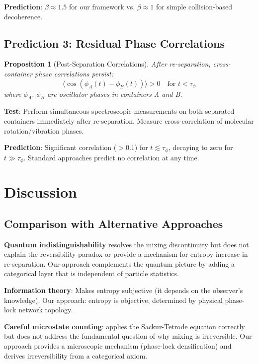 \documentclass[superscriptaddress,prb,10pt]{revtex4-2}
\newtheorem{proposition}[theorem]{Proposition}
\theoremstyle{definition}
\theoremstyle{remark}
\begin{document}
\textbf{Prediction}: $\beta \approx 1.5$ for our framework vs. $\beta \approx 1$ for simple collision-based decoherence.

\subsection{Prediction 3: Residual Phase Correlations}

\begin{proposition}[Post-Separation Correlations]
After re-separation, cross-container phase correlations persist:
\begin{equation}
\langle \cos(\phi_A(t) - \phi_B(t)) \rangle > 0 \quad \text{for } t < \tau_{\phi}
\end{equation}
where $\phi_A$, $\phi_B$ are oscillator phases in containers A and B.
\end{proposition}

\textbf{Test}: Perform simultaneous spectroscopic measurements on both separated containers immediately after re-separation. Measure cross-correlation of molecular rotation/vibration phases.

\textbf{Prediction}: Significant correlation ($> 0.1$) for $t \lesssim \tau_{\phi}$, decaying to zero for $t \gg \tau_{\phi}$. Standard approaches predict no correlation at any time.

\section{Discussion}

\subsection{Comparison with Alternative Approaches}

\textbf{Quantum indistinguishability} resolves the mixing discontinuity but does not explain the reversibility paradox or provide a mechanism for entropy increase in re-separation. Our approach complements the quantum picture by adding a categorical layer that is independent of particle statistics.

\textbf{Information theory}: Makes entropy subjective (it depends on the observer's knowledge). Our approach: entropy is objective, determined by physical phase-lock network topology.

\textbf{Careful microstate counting}: applies the Sackur-Tetrode equation correctly but does not address the fundamental question of why mixing is irreversible. Our approach provides a microscopic mechanism (phase-lock densification) and derives irreversibility from a categorical axiom.
\end{document}
